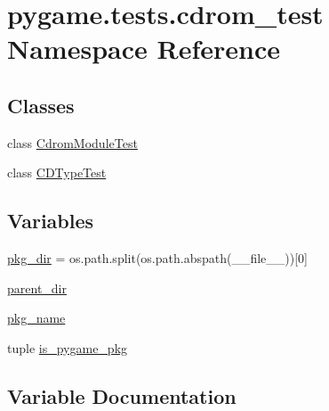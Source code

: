 \hypertarget{namespacepygame_1_1tests_1_1cdrom__test}{}\section{pygame.\+tests.\+cdrom\+\_\+test Namespace Reference}
\label{namespacepygame_1_1tests_1_1cdrom__test}
\subsection*{Classes}
\begin{DoxyCompactItemize}
\item 
class \hyperlink{classpygame_1_1tests_1_1cdrom__test_1_1_cdrom_module_test}{Cdrom\+Module\+Test}
\item 
class \hyperlink{classpygame_1_1tests_1_1cdrom__test_1_1_c_d_type_test}{C\+D\+Type\+Test}
\end{DoxyCompactItemize}
\subsection*{Variables}
\begin{DoxyCompactItemize}
\item 
\hyperlink{namespacepygame_1_1tests_1_1cdrom__test_aa0f3f591d4f419a6e900f76efef45aa6}{pkg\+\_\+dir} = os.\+path.\+split(os.\+path.\+abspath(\+\_\+\+\_\+file\+\_\+\+\_\+))\mbox{[}0\mbox{]}
\item 
\hyperlink{namespacepygame_1_1tests_1_1cdrom__test_a8bb56f34db9aa98d63792357454997bc}{parent\+\_\+dir}
\item 
\hyperlink{namespacepygame_1_1tests_1_1cdrom__test_ad1e97590e1f83205f4c447f2d03c2316}{pkg\+\_\+name}
\item 
tuple \hyperlink{namespacepygame_1_1tests_1_1cdrom__test_a2b7584f82a1e79121fcec1b5de0277fd}{is\+\_\+pygame\+\_\+pkg}
\end{DoxyCompactItemize}


\subsection{Variable Documentation}
\mbox{\label{namespacepygame_1_1tests_1_1cdrom__test_a2b7584f82a1e79121fcec1b5de0277fd}} 
